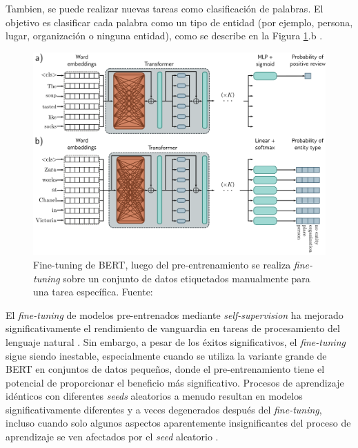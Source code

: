 Tambien, se puede realizar nuevas tareas como clasificación de palabras. El objetivo es clasificar cada palabra como un tipo de entidad (por ejemplo, persona, lugar, organización o ninguna entidad), como se describe en la Figura \ref{fig:bert2}.b \citep{prince2023understanding}.

\begin{figure}[H]
	\centering
	\includegraphics[width=\textwidth]{../img/theory/pre-training2}
	\caption[Fine-tuning de BERT]{Fine-tuning de BERT, luego del pre-entrenamiento se realiza \textit{fine-tuning} sobre un conjunto de datos etiquetados manualmente para una tarea específica. Fuente: \cite{prince2023understanding}}
	\label{fig:bert2}
\end{figure}


El \textit{fine-tuning} de modelos pre-entrenados mediante \textit{self-supervision} ha mejorado significativamente el rendimiento de vanguardia en tareas de procesamiento del lenguaje natural \citep{zhang2020revisiting}. Sin embargo, a pesar de los éxitos significativos, el \textit{fine-tuning} sigue siendo inestable, especialmente cuando se utiliza la variante grande de BERT en conjuntos de datos pequeños, donde el pre-entrenamiento tiene el potencial de proporcionar el beneficio más significativo. Procesos de aprendizaje idénticos con diferentes \textit{seeds} aleatorios a menudo resultan en modelos significativamente diferentes y a veces degenerados después del \textit{fine-tuning}, incluso cuando solo algunos aspectos aparentemente insignificantes del proceso de aprendizaje se ven afectados por el \textit{seed} aleatorio  \citep{zhang2020revisiting,prince2023understanding}.

